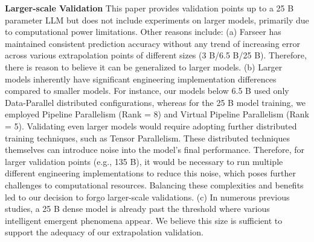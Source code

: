 \documentclass{article}
\begin{document}
\textbf{Larger-scale Validation}
    This paper provides validation points up to a 25 B parameter LLM but does not include experiments on larger models, primarily due to computational power limitations. Other reasons include:
    (a) Farseer has maintained consistent prediction accuracy without any trend of increasing error across various extrapolation points of different sizes (3 B/6.5 B/25 B). Therefore, there is reason to believe it can be generalized to larger models.
    (b) Larger models inherently have significant engineering implementation differences compared to smaller models. For instance, our models below 6.5 B used only Data-Parallel distributed configurations, whereas for the 25 B model training, we employed Pipeline Parallelism (Rank = 8) and Virtual Pipeline Parallelism (Rank = 5). Validating even larger models would require adopting further distributed training techniques, such as Tensor Parallelism. These distributed techniques themselves can introduce noise into the model's final performance. Therefore, for larger validation points (e.g., 135 B), it would be necessary to run multiple different engineering implementations to reduce this noise, which poses further challenges to computational resources. Balancing these complexities and benefits led to our decision to forgo larger-scale validations.
    (c) In numerous previous studies, a 25 B dense model is already past the threshold where various intelligent emergent phenomena appear. We believe this size is sufficient to support the adequacy of our extrapolation validation.
\end{document}
